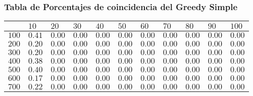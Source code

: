 \documentclass[12pt]{article}
\begin{document}
\subsubsection*{Tabla de Porcentajes de coincidencia del Greedy Simple}
\begin{tabu}{|@{}*{11}{p{1.4cm}@{}|}}
%
& $10$ & $20$ & $30$ & $40$ & $50$ & $60$ & $70$ & $80$ & $90$ & $100$ \\\hline
$100$ & $0.41$ & $0.00$ & $0.00$ & $0.00$ & $0.00$ & $0.00$ & $0.00$ & $0.00$ & $0.00$ & $0.00$ \\\hline
$200$ & $0.20$ & $0.00$ & $0.00$ & $0.00$ & $0.00$ & $0.00$ & $0.00$ & $0.00$ & $0.00$ & $0.00$ \\\hline
$300$ & $0.20$ & $0.00$ & $0.00$ & $0.00$ & $0.00$ & $0.00$ & $0.00$ & $0.00$ & $0.00$ & $0.00$ \\\hline
$400$ & $0.38$ & $0.00$ & $0.00$ & $0.00$ & $0.00$ & $0.00$ & $0.00$ & $0.00$ & $0.00$ & $0.00$ \\\hline
$500$ & $0.40$ & $0.00$ & $0.00$ & $0.00$ & $0.00$ & $0.00$ & $0.00$ & $0.00$ & $0.00$ & $0.00$ \\\hline
$600$ & $0.17$ & $0.00$ & $0.00$ & $0.00$ & $0.00$ & $0.00$ & $0.00$ & $0.00$ & $0.00$ & $0.00$ \\\hline
$700$ & $0.22$ & $0.00$ & $0.00$ & $0.00$ & $0.00$ & $0.00$ & $0.00$ & $0.00$ & $0.00$ & $0.00$ \\\hline

\end{tabu}
\end{document}
